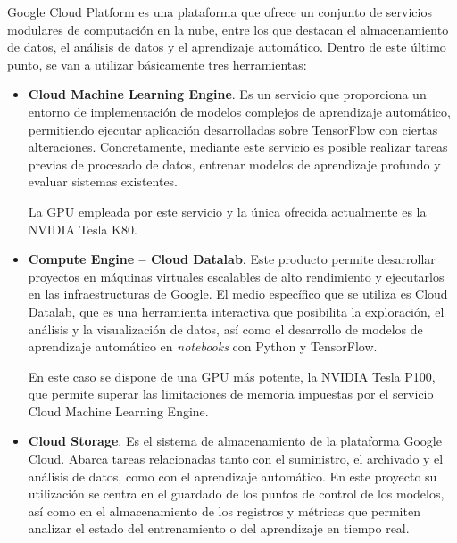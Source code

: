 Google Cloud Platform es una plataforma que ofrece un conjunto de servicios modulares de computación en la nube, entre los que destacan el almacenamiento de datos, el análisis de datos y el aprendizaje automático. Dentro de este último punto, se van a utilizar básicamente tres herramientas: \begin{itemize}
  \item \textbf{Cloud Machine Learning Engine}. Es un servicio que proporciona un entorno de implementación de modelos complejos de aprendizaje automático, permitiendo ejecutar aplicación desarrolladas sobre TensorFlow con ciertas alteraciones. Concretamente, mediante este servicio es posible realizar tareas previas de procesado de datos, entrenar modelos de aprendizaje profundo y evaluar sistemas existentes.
  
  La GPU empleada por este servicio y la única ofrecida actualmente es la NVIDIA Tesla K80.
  \item \textbf{Compute Engine -- Cloud Datalab}. Este producto permite desarrollar proyectos en máquinas virtuales escalables de alto rendimiento y ejecutarlos en las infraestructuras de Google. El medio específico que se utiliza es Cloud Datalab, que es una herramienta interactiva que posibilita la exploración, el análisis y la visualización de datos, así como el desarrollo de modelos de aprendizaje automático en \textit{notebooks} con Python y TensorFlow.
  
  En este caso se dispone de una GPU más potente, la NVIDIA Tesla P100, que permite superar las limitaciones de memoria impuestas por el servicio Cloud Machine Learning Engine.
  \item \textbf{Cloud Storage}. Es el sistema de almacenamiento de la plataforma Google Cloud. Abarca tareas relacionadas tanto con el suministro, el archivado y el análisis de datos, como con el aprendizaje automático. En este proyecto su utilización se centra en el guardado de los puntos de control de los modelos, así como en el almacenamiento de los registros y métricas que permiten analizar el estado del entrenamiento o del aprendizaje en tiempo real. 
\end{itemize}

